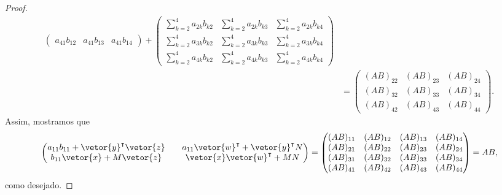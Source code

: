 \begin{proof}
\begin{align*}
\begin{pmatrix}
            a_{41}b_{12} & a_{41} b_{13} & a_{41} b_{14}
        \end{pmatrix}+
        \begin{pmatrix}
            \sum_{k=2}^4 a_{2k}b_{k2} & \sum_{k=2}^4 a_{2k}b_{k3} & \sum_{k=2}^4 a_{2k}b_{k4}\\
            \sum_{k=2}^4 a_{3k}b_{k2} & \sum_{k=2}^4 a_{3k}b_{k3} & \sum_{k=2}^4 a_{3k}b_{k4}\\
            \sum_{k=2}^4 a_{4k}b_{k2} & \sum_{k=2}^4 a_{4k}b_{k3} & \sum_{k=2}^4 a_{4k}b_{k4}
        \end{pmatrix}\\
                                          &= \begin{pmatrix}
                                              (AB)_{22} & (AB)_{23} & (AB)_{24}\\
                                              (AB)_{32} & (AB)_{33} & (AB)_{34}\\
                                              (AB)_{42} & (AB)_{43} & (AB)_{44}
                                          \end{pmatrix}.
    \end{align*}
    Assim, mostramos que
    \begin{equation*}
        \begin{pmatrix}
            a_{11}b_{11} + \vetor{y}^\intercal \vetor{z} && a_{11} \vetor{w}^\intercal + \vetor{y}^\intercal N\\
            b_{11} \vetor{x} + M \vetor{z} && \vetor{x}\vetor{w}^\intercal + MN
        \end{pmatrix} = \begin{pmatrix}
            (AB)_{11} & (AB)_{12} & (AB)_{13} & (AB)_{14}\\
            (AB)_{21} & (AB)_{22} & (AB)_{23} & (AB)_{24}\\
            (AB)_{31} & (AB)_{32} & (AB)_{33} & (AB)_{34}\\
            (AB)_{41} & (AB)_{42} & (AB)_{43} & (AB)_{44}
        \end{pmatrix} = AB,
    \end{equation*}
    como desejado.
\end{proof}
